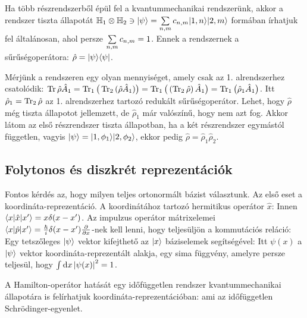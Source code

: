    Ha több részrendszerből épül fel a kvantummechanikai rendszerünk, akkor a rendszer tiszta állapotát $\mathbb{H}_1\otimes\mathbb{H}_2\ni\lvert\psi\rangle=\sum\limits_{n,m}^{}c_{n,m}\lvert1,n\rangle\lvert2,m\rangle$ formában írhatjuk fel általánosan, ahol persze $\sum\limits_{n,m}^{}c_{n,m}=1$. Ennek a rendszernek a sűrűségoperátora: $\hat\rho= \lvert\psi\rangle\langle\psi\rvert$.
   
   Mérjünk a rendszeren egy olyan mennyiséget, amely csak az 1. alrendszerhez csatolódik: $\mathop{\mathrm{Tr}}\nolimits{\hat\rho\hat A_1}=\mathop{\mathrm{Tr}}\nolimits_1{\big(\mathop{\mathrm{Tr}}\nolimits_2{(\hat\rho\hat A_1)}\big)}=\mathop{\mathrm{Tr}}\nolimits_1{\big(\left(\mathop{\mathrm{Tr}}\nolimits_2{\hat\rho}\right)\hat A_1\big)}= \mathop{\mathrm{Tr}}\nolimits_1\big(\hat\rho_1\hat A_1\big)$. Itt $\hat\rho_1=\mathop{\mathrm{Tr}}\nolimits_2\hat\rho$ az 1. alrendszerhez tartozó redukált sűrűségoperátor. Lehet, hogy $\hat\rho$ még tiszta állapotot jellemzett, de $\hat\rho_1$ már valószínű, hogy nem azt fog. Akkor látom az első részrendszer tiszta állapotban, ha a két részrendszer egymástól független, vagyis $\lvert\psi\rangle=\lvert1,\phi_1\rangle\lvert2,\phi_2\rangle$, ekkor pedig $\hat\rho=\hat\rho_1\hat\rho_2$. 
   
  \subsection{Folytonos és diszkrét reprezentációk}
   
   Fontos kérdés az, hogy milyen teljes ortonormált bázist választunk. Az első eset a koordináta-reprezentáció. A koordinátához tartozó hermitikus operátor $\hat{x}$:
   Innen $\langle x\rvert\hat{x}\lvert x'\rangle=x\delta (x-x')$. Az impulzus operátor mátrixelemei $\langle x\rvert\hat{p}\lvert x'\rangle=\frac{\hbar}{i}\delta (x-x')\frac{\partial }{\partial x}$-nek kell lenni, hogy teljesüljön a kommutációs reláció:
   Egy tetszőleges $\lvert\psi\rangle$ vektor kifejthető az $\lvert x\rangle$ báziselemek segítségével:
   Itt $\psi(x)$ a $\lvert\psi\rangle$ vektor koordináta-reprezentált alakja, egy sima függvény, amelyre persze teljesül, hogy $\int \mathrm{d} x \left\lvert\psi(x)\right\rvert^2=1$.
   
   A Hamilton-operátor hatását egy időfüggetlen rendszer kvantummechanikai állapotára is felírhatjuk koordináta-reprezentációban:
   ami az időfüggetlen Schrödinger-egyenlet. 
   
